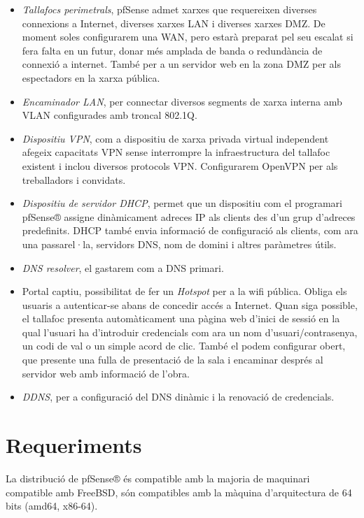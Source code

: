 \documentclass[
  10pt,
]{krantz}
\begin{document}
\begin{itemize}
\item
  \emph{Tallafocs perimetrals}, pfSense admet xarxes que requereixen diverses connexions a Internet, diverses xarxes LAN i diverses xarxes DMZ. De moment soles configurarem una WAN, pero estarà preparat pel seu escalat si fera falta en un futur, donar més amplada de banda o redundància de connexió a internet. També per a un servidor web en la zona DMZ per als espectadors en la xarxa pública.
\item
  \emph{Encaminador LAN}, per connectar diversos segments de xarxa interna amb VLAN configurades amb troncal 802.1Q.
\item
  \emph{Dispositiu VPN}, com a dispositiu de xarxa privada virtual independent afegeix capacitats VPN sense interrompre la infraestructura del tallafoc existent i inclou diversos protocols VPN. Configurarem OpenVPN per als treballadors i convidats.
\item
  \emph{Dispositiu de servidor DHCP}, permet que un dispositiu com el programari pfSense® assigne dinàmicament adreces IP als clients des d'un grup d'adreces predefinits. DHCP també envia informació de configuració als clients, com ara una passarel·la, servidors DNS, nom de domini i altres paràmetres útils.
\item
  \emph{DNS resolver}, el gastarem com a DNS primari.
\item
  Portal captiu, possibilitat de fer un \emph{Hotspot} per a la wifi pública. Obliga els usuaris a autenticar-se abans de concedir accés a Internet. Quan siga possible, el tallafoc presenta automàticament una pàgina web d'inici de sessió en la qual l'usuari ha d'introduir credencials com ara un nom d'usuari/contrasenya, un codi de val o un simple acord de clic. També el podem configurar obert, que presente una fulla de presentació de la sala i encaminar després al servidor web amb informació de l'obra.
\item
  \emph{DDNS}, per a configuració del DNS dinàmic i la renovació de credencials.
\end{itemize}

\hypertarget{requeriments}{%
\section{Requeriments}\label{requeriments}}

La distribució de pfSense® és compatible amb la majoria de maquinari compatible amb FreeBSD, són compatibles amb la màquina d'arquitectura de 64 bits (amd64, x86-64).
\end{document}
